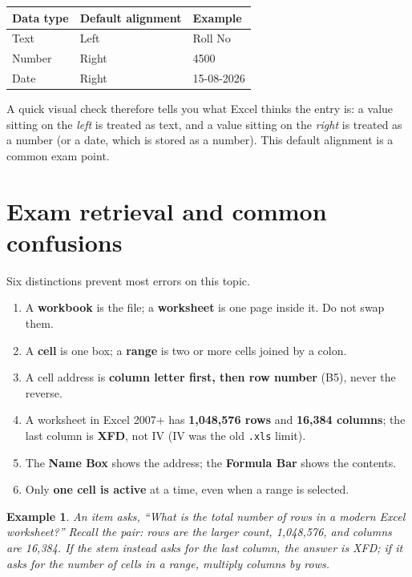 \documentclass[11pt]{article}
\newtheorem{example}{Example}[section]
\begin{document}
\begin{center}
\begin{tabular}{lll}
\toprule
\textbf{Data type} & \textbf{Default alignment} & \textbf{Example} \\
\midrule
Text & Left & Roll No \\
Number & Right & 4500 \\
Date & Right & 15-08-2026 \\
\bottomrule
\end{tabular}
\end{center}

A quick visual check therefore tells you what Excel thinks the entry is: a
value sitting on the \emph{left} is treated as text, and a value sitting on
the \emph{right} is treated as a number (or a date, which is stored as a
number). This default alignment is a common exam point.

\section{Exam retrieval and common confusions}
Six distinctions prevent most errors on this topic.
\begin{enumerate}
  \item A \textbf{workbook} is the file; a \textbf{worksheet} is one page
    inside it. Do not swap them.
  \item A \textbf{cell} is one box; a \textbf{range} is two or more cells
    joined by a colon.
  \item A cell address is \textbf{column letter first, then row number}
    (B5), never the reverse.
  \item A worksheet in Excel 2007+ has \textbf{1,048,576 rows} and
    \textbf{16,384 columns}; the last column is \textbf{XFD}, not IV (IV was
    the old \texttt{.xls} limit).
  \item The \textbf{Name Box} shows the address; the \textbf{Formula Bar}
    shows the contents.
  \item Only \textbf{one cell is active} at a time, even when a range is
    selected.
\end{enumerate}

\begin{example}
An item asks, ``What is the total number of rows in a modern Excel
worksheet?'' Recall the pair: rows are the larger count, 1,048,576, and
columns are 16,384. If the stem instead asks for the last column, the answer
is XFD; if it asks for the number of cells in a range, multiply columns by
rows.
\end{example}
\end{document}

